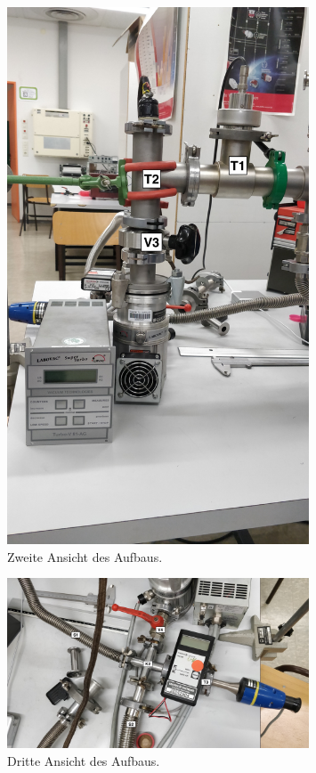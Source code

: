 \begin{figure}
	\centering
	\includegraphics[width=0.8\textwidth]{img/Aufbau2.jpg}
	\caption{Zweite Ansicht des Aufbaus.}
	\label{img:ab2}
\end{figure}
\begin{figure}
	\centering
	\includegraphics[width=0.8\textwidth]{img/Aufbau3.jpg}
	\caption{Dritte Ansicht des Aufbaus.}
	\label{img:ab3}
\end{figure}
